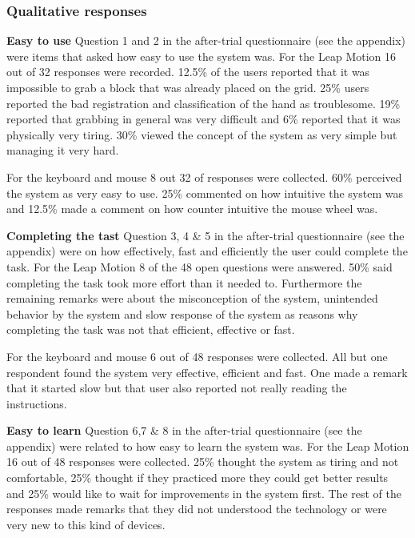 \subsubsection{Qualitative responses}
\textbf{Easy to use}\newline
Question 1 and 2 in the after-trial questionnaire (see the appendix) were items that asked how easy to use the system was. For the Leap Motion 16 out of 32 responses were 
recorded. 12.5\% of the users reported that it was impossible to grab a block that was already placed on the grid. 25\% users reported the bad registration and classification 
of the hand as troublesome. 19\% reported that grabbing in general was very difficult and 6\% reported that it was physically very tiring. 30\% viewed the concept of the system 
as very simple but managing it very hard.

For the keyboard and mouse 8 out 32 of responses were collected. 60\% perceived the system as very easy to use. 25\% commented on how intuitive the system was and 12.5\% made a 
comment on how counter intuitive the mouse wheel was. \newline

\noindent\textbf{Completing the tast}\newline
Question 3, 4 \& 5 in the after-trial questionnaire (see the appendix) were on how effectively, fast and efficiently the user could complete the task. For the Leap Motion 8 of 
the 48 open questions were answered. 50\% said completing the task took more effort than it needed to. Furthermore the remaining remarks were about the misconception of the system,
 unintended behavior by the system and slow response of the system as reasons why completing the task was not that efficient, effective or fast.

For the keyboard and mouse 6 out of 48 responses were collected. All but one respondent found the system very effective, efficient and fast. One made a remark that it started
 slow but that user also reported not really reading the instructions. \newline

\noindent\textbf{Easy to learn}\newline
Question 6,7 \& 8 in the after-trial questionnaire (see the appendix) were related to how easy to learn the system was. For the Leap Motion 16 out of 48 responses were 
collected. 25\% thought the system as tiring and not comfortable, 25\% thought if they practiced more they could get better results and 25\% would like to wait for 
improvements in the system first. The rest of the responses made remarks that they did not understood the technology or were very new to this kind of devices.  

